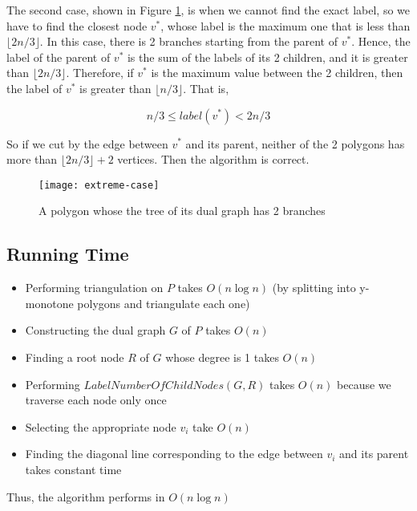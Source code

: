 The second case, shown in Figure \ref{fig:extremecase}, is when we cannot find the exact label, so we have to find the closest node $v^*$, whose 
label is the maximum one that is less than $\lfloor2n/3\rfloor$. In this case, there is 2 branches starting
from the parent of $v^*$. Hence, the label of the parent of $v^*$ is the sum of the labels of its 2 children, 
and it is greater than $\lfloor2n/3\rfloor$. Therefore, if $v^*$ is the maximum value between the 2 children, 
then the label of $v^*$ is greater than $\lfloor n/3 \rfloor$. That is,

$$n/3 \leq label(v^*) < 2n/3$$

So if we cut by the edge between $v^*$ and its parent, neither of the 2 polygons has more than $\lfloor2n/3\rfloor + 2$ vertices.
Then the algorithm is correct. \\

\begin{center}
    \label{figure1}
    \begin{figure}[h]
    \centering
    \texttt{[image: extreme-case]}\\
    \caption{A polygon whose the tree of its dual graph has 2 branches} \label{fig:extremecase}
    \end{figure}
\end{center}


\subsection*{Running Time}
\begin{itemize}
    \item Performing triangulation on $P$ takes $O(n\log{n})$ (by splitting into y-monotone polygons and triangulate each one)
    \item Constructing the dual graph $G$ of $P$ takes $O(n)$
    \item Finding a root node $R$ of $G$ whose degree is 1 takes $O(n)$
    \item Performing $LabelNumberOfChildNodes(G,R)$ takes $O(n)$ because we traverse each node only once
    \item Selecting the appropriate node $v_i$ take $O(n)$
    \item Finding the diagonal line corresponding to the edge between $v_i$ and its parent takes constant time
\end{itemize}

Thus, the algorithm performs in $O(n\log{n})$
